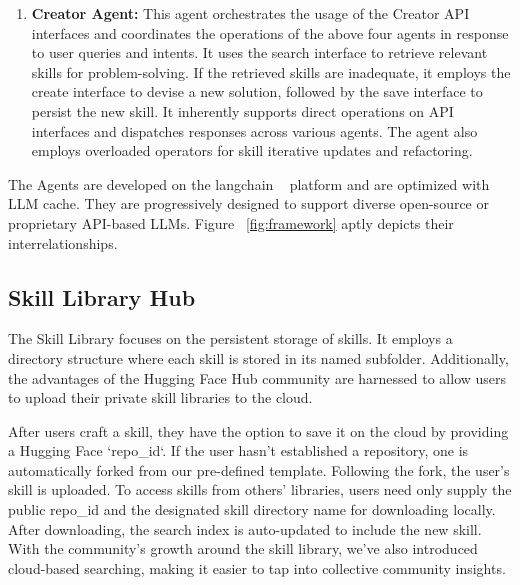 \begin{enumerate}
    \item \textbf{Creator Agent:} This agent orchestrates the usage of the Creator API interfaces and coordinates the operations of the above four agents in response to user queries and intents. It uses the search interface to retrieve relevant skills for problem-solving. If the retrieved skills are inadequate, it employs the create interface to devise a new solution, followed by the save interface to persist the new skill. It inherently supports direct operations on API interfaces and dispatches responses across various agents. The agent also employs overloaded operators for skill iterative updates and refactoring.
\end{enumerate}

The Agents are developed on the langchain ~\cite{langchain} platform and are optimized with LLM cache. They are progressively designed to support diverse open-source or proprietary API-based LLMs.  Figure ~\ref{fig:framework} aptly depicts their interrelationships.

\subsection{Skill Library Hub}

The Skill Library focuses on the persistent storage of skills. It employs a directory structure where each skill is stored in its named subfolder. Additionally, the advantages of the Hugging Face Hub community are harnessed to allow users to upload their private skill libraries to the cloud.

After users craft a skill, they have the option to save it on the cloud by providing a Hugging Face `repo\_id`. If the user hasn't established a repository, one is automatically forked from our pre-defined template. Following the fork, the user's skill is uploaded. To access skills from others' libraries, users need only supply the public repo\_id and the designated skill directory name for downloading locally. After downloading, the search index is auto-updated to include the new skill. With the community's growth around the skill library, we've also introduced cloud-based searching, making it easier to tap into collective community insights.